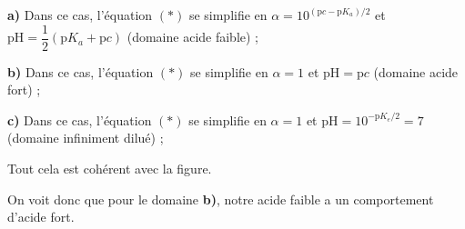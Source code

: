 \begin{solution}
\begin{questions}
    \textbf{\sffamily a)} Dans ce cas, l'équation $(\ast)$ se simplifie en $\alpha = 10^{(\text{p}c-\text{p}K_a)/2}$ et $\text{pH} = \dfrac{1}{2}(\text{p}K_a + \text{p}c)$ (domaine acide faible) ;
    
    \textbf{\sffamily b)} Dans ce cas, l'équation $(\ast)$ se simplifie en $\alpha = 1$ et $\text{pH} = \text{p}c$ (domaine acide fort) ;
    
    \textbf{\sffamily c)} Dans ce cas, l'équation $(\ast)$ se simplifie en $\alpha = 1$ et $\text{pH} = 10^{-\text{p}K_e/2} = 7$ (domaine infiniment dilué) ;
    
    Tout cela est cohérent avec la figure.
    
    \question On voit donc que pour le domaine \textbf{\sffamily b)}, notre acide faible a un comportement d'acide fort.
\end{questions}
\end{solution}